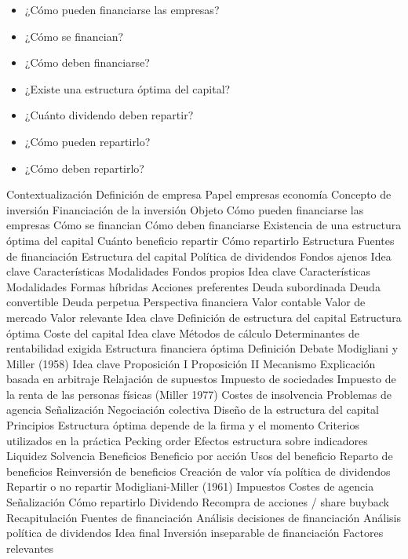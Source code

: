 \documentclass{nuevotema}
\begin{document}
\begin{itemize}
    \item ¿Cómo pueden financiarse las empresas?
    \item ¿Cómo se financian?
    \item ¿Cómo deben financiarse?
    \item ¿Existe una estructura óptima del capital?
    \item ¿Cuánto dividendo deben repartir?
    \item ¿Cómo pueden repartirlo?
    \item ¿Cómo deben repartirlo?
\end{itemize}

\esquemacorto

\begin{esquema}[enumerate]
	\1[] 
		\2 Contextualización
			\3 Definición de empresa
			\3 Papel empresas economía
			\3 Concepto de inversión
			\3 Financiación de la inversión
		\2 Objeto
			\3 Cómo pueden financiarse las empresas
			\3 Cómo se financian
			\3 Cómo deben financiarse
			\3 Existencia de una estructura óptima del capital
			\3 Cuánto beneficio repartir
			\3 Cómo repartirlo
		\2 Estructura
			\3 Fuentes de financiación
			\3 Estructura del capital
			\3 Política de dividendos
	\1 
		\2 Fondos ajenos
			\3 Idea clave
			\3 Características
			\3 Modalidades
		\2 Fondos propios
			\3 Idea clave
			\3 Características
			\3 Modalidades
		\2 Formas híbridas
			\3 Acciones preferentes
			\3 Deuda subordinada
			\3 Deuda convertible
			\3 Deuda perpetua
		\2 Perspectiva financiera
			\3 Valor contable
			\3 Valor de mercado
			\3 Valor relevante
	\1 
		\2 Idea clave
			\3 Definición de estructura del capital
			\3 Estructura óptima
		\2 Coste del capital
			\3 Idea clave
			\3 Métodos de cálculo
			\3 Determinantes de rentabilidad exigida
		\2 Estructura financiera óptima
			\3 Definición
			\3 Debate
		\2 Modigliani y Miller (1958)
			\3 Idea clave
			\3 Proposición I
			\3 Proposición II
			\3 Mecanismo
			\3 Explicación basada en arbitraje
		\2 Relajación de supuestos
			\3 Impuesto de sociedades
			\3 Impuesto de la renta de las personas físicas (Miller 1977)
			\3 Costes de insolvencia
			\3 Problemas de agencia
			\3 Señalización
			\3 Negociación colectiva
		\2 Diseño de la estructura del capital
			\3 Principios
			\3 Estructura óptima depende de la firma y el momento
			\3 Criterios utilizados en la práctica
			\3 Pecking order
		\2 Efectos estructura sobre indicadores
			\3 Liquidez
			\3 Solvencia
			\3 Beneficios
			\3 Beneficio por acción
	\1 
		\2 Usos del beneficio
			\3 Reparto de beneficios
			\3 Reinversión de beneficios
			\3 Creación de valor vía política de dividendos
		\2 Repartir o no repartir
			\3 Modigliani-Miller (1961)
			\3 Impuestos
			\3 Costes de agencia
			\3 Señalización
		\2 Cómo repartirlo
			\3 Dividendo
			\3 Recompra de acciones / share buyback
	\1[] 
		\2 Recapitulación
			\3 Fuentes de financiación
			\3 Análisis decisiones de financiación
			\3 Análisis política de dividendos
		\2 Idea final
			\3 Inversión inseparable de financiación
			\3 Factores relevantes


\end{esquema}
\end{document}
